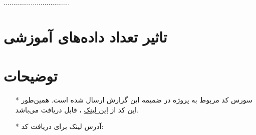\documentclass[11.5pt,a4paper]{article}
\begin{document}
..................................

\section{تاثیر تعداد داده‌های آموزشی}















\vfill
\section{توضیحات}
\begin{itemize}
\item [*] سورس کد مربوط به پروژه در ضمیمه این گزارش ارسال شده است. همین‌طور این کد از
\href{https://github.com/ahmad-asadi/PGM/tree/master/BayesianNetwork}
{این لینک}
، قابل 
دریافت می‌باشد.
\item [*] آدرس لینک برای دریافت کد:
\end{itemize}
\end{document}

